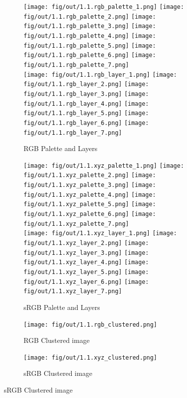 \documentclass[tikz,14pt,fleqn]{article}
\begin{document}
\begin{figure}[h!]
    \centering
    \begin{subfigure}[]{\linewidth}
        \centering
        \texttt{[image: fig/out/1.1.rgb\_palette\_1.png]}
        \texttt{[image: fig/out/1.1.rgb\_palette\_2.png]}
        \texttt{[image: fig/out/1.1.rgb\_palette\_3.png]}
        \texttt{[image: fig/out/1.1.rgb\_palette\_4.png]}
        \texttt{[image: fig/out/1.1.rgb\_palette\_5.png]}
        \texttt{[image: fig/out/1.1.rgb\_palette\_6.png]}
        \texttt{[image: fig/out/1.1.rgb\_palette\_7.png]}\\
        \texttt{[image: fig/out/1.1.rgb\_layer\_1.png]}
        \texttt{[image: fig/out/1.1.rgb\_layer\_2.png]}
        \texttt{[image: fig/out/1.1.rgb\_layer\_3.png]}
        \texttt{[image: fig/out/1.1.rgb\_layer\_4.png]}
        \texttt{[image: fig/out/1.1.rgb\_layer\_5.png]}
        \texttt{[image: fig/out/1.1.rgb\_layer\_6.png]}
        \texttt{[image: fig/out/1.1.rgb\_layer\_7.png]}
        \caption{RGB Palette and Layers}
        \label{fig:1.1.rgb_palette_layers}
    \end{subfigure}
    \begin{subfigure}[]{\linewidth}
        \centering
        \texttt{[image: fig/out/1.1.xyz\_palette\_1.png]}
        \texttt{[image: fig/out/1.1.xyz\_palette\_2.png]}
        \texttt{[image: fig/out/1.1.xyz\_palette\_3.png]}
        \texttt{[image: fig/out/1.1.xyz\_palette\_4.png]}
        \texttt{[image: fig/out/1.1.xyz\_palette\_5.png]}
        \texttt{[image: fig/out/1.1.xyz\_palette\_6.png]}
        \texttt{[image: fig/out/1.1.xyz\_palette\_7.png]}\\
        \texttt{[image: fig/out/1.1.xyz\_layer\_1.png]}
        \texttt{[image: fig/out/1.1.xyz\_layer\_2.png]}
        \texttt{[image: fig/out/1.1.xyz\_layer\_3.png]}
        \texttt{[image: fig/out/1.1.xyz\_layer\_4.png]}
        \texttt{[image: fig/out/1.1.xyz\_layer\_5.png]}
        \texttt{[image: fig/out/1.1.xyz\_layer\_6.png]}
        \texttt{[image: fig/out/1.1.xyz\_layer\_7.png]}
        \caption{sRGB Palette and Layers}
        \label{fig:1.1.xyz_palette_layers}
    \end{subfigure}
    \begin{subfigure}[]{0.25\linewidth}
        \texttt{[image: fig/out/1.1.rgb\_clustered.png]}
        \caption{RGB Clustered image}
        \label{fig:1.1.rgb_clustered}
    \end{subfigure}
    \begin{subfigure}[]{0.25\linewidth}
        \texttt{[image: fig/out/1.1.xyz\_clustered.png]}
        \caption{sRGB Clustered image}
        \label{fig:1.1.xyz_clustered}
    \end{subfigure}
\end{figure}
\end{document}
